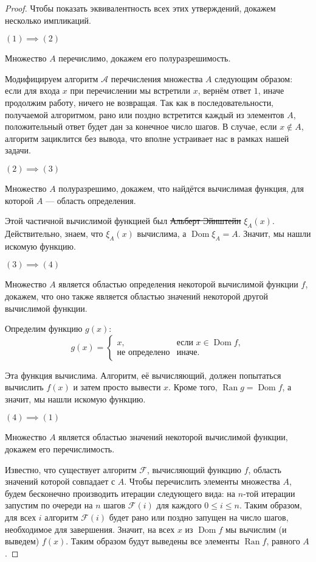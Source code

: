 \documentclass{article}
\begin{document}
    \begin{proof}
        Чтобы показать эквивалентность всех этих утверждений, докажем несколько импликаций.

        $(1) \implies (2)$

        Множество $A$ перечислимо, докажем его полуразрешимость.

        Модифицируем алгоритм $\mathcal{A}$ перечисления множества $A$ следующим образом: если для входа $x$
        при перечислении мы встретили $x$, вернём ответ $1$, иначе продолжим работу, ничего не возвращая.
        Так как в последовательности, получаемой алгоритмом, рано или поздно встретится каждый из
        элементов $A$, положительный ответ будет дан за конечное число шагов. В случае, если $x
        \not\in A$, алгоритм зациклится без вывода, что вполне устраивает нас в рамках нашей задачи.

        $(2) \implies (3)$

        Множество $A$ полуразрешимо, докажем, что найдётся вычислимая функция, для которой $A$ ---
        область определения.

        Этой частичной вычислимой функцией был \sout{Альберт Эйнштейн} $\xi_A(x)$. Действительно,
        знаем, что $\xi_A(x)$ вычислима, а $\operatorname{Dom} \xi_A = A$. Значит, мы
        нашли искомую функцию.

        $(3) \implies (4)$

        Множество $A$ является областью определения некоторой вычислимой функции $f$, докажем, что
        оно также является областью значений некоторой другой вычислимой функции.

        Определим функцию $g(x)$:
        $$
            g(x) =
            \begin{cases}
                x, & \text{если } x \in \operatorname{Dom} f,\\
                \text{не определено} & \text{иначе.}
            \end{cases}
        $$

        Эта функция вычислима. Алгоритм, её вычисляющий, должен попытаться вычислить $f(x)$ и затем
        просто вывести $x$. Кроме того, $\operatorname{Ran} g = \operatorname{Dom} f$, а значит, мы
        нашли искомую функцию.

        $(4) \implies (1)$

        Множество $A$ является областью значений некоторой вычислимой функции, докажем его
        перечислимость.

        Известно, что существует алгоритм $\mathcal{F}$, вычисляющий функцию $f$, область значений
        которой совпадает с $A$. Чтобы перечислить элементы множества $A$, будем бесконечно
        производить итерации следующего вида: на $n$-той итерации запустим по очереди на $n$
        шагов $\mathcal{F}(i)$ для каждого $0 \leqslant i \leqslant n$. Таким образом, для всех $i$
        алгоритм $\mathcal{F}(i)$ будет рано или поздно запущен на число шагов, необходимое для
        завершения.  Значит, на всех $x$ из $\operatorname{Dom} f$ мы вычислим (и выведем) $f(x)$.
        Таким образом будут выведены все элементы $\operatorname{Ran} f$, равного $A$.


\end{proof}
\end{document}
